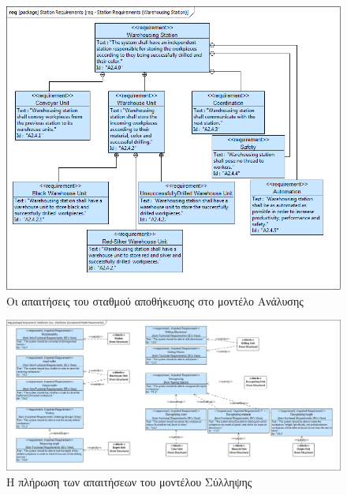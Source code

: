 \documentclass[a4paper,12pt,twoside]{report}
\begin{document}
\begin{appendices}
			\begin{figure}[hp]
					\centering
					\includegraphics[scale=0.30]{AnalysisModel_req-StationRequirements(WarehousingStation).png}
					\caption{Οι απαιτήσεις του σταθμού αποθήκευσης στο μοντέλο Ανάλυσης}
					\label{φωτ:Οι απαιτήσεις του σταθμού αποθήκευσης στο μοντέλο Ανάλυσης}
			\end{figure}
			
			\begin{figure}[hp]
					\centering
					\includegraphics[scale=0.20]{AnalysisModel_req-Satisfaction(ConceptionalModelsRequirements).png}
					\caption{Η πλήρωση των απαιτήσεων του μοντέλου Σύλληψης}
					\label{φωτ:Η πλήρωση των απαιτήσεων του μοντέλου Σύλληψης}
			\end{figure}
			

\end{appendices}
\end{document}
